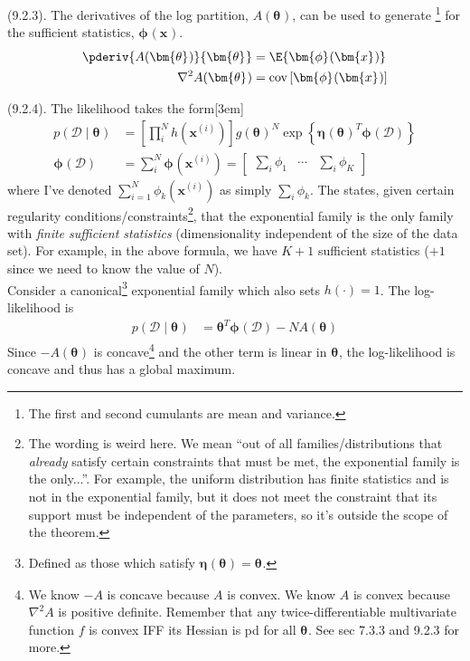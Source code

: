 \documentclass[11pt]{article}
\renewcommand\vec[2][]{\bm{#2}_{#1}}
\newcommand\myspace[1][]{\vspace{#1\bigskipamount}}
\newcommand\p{\Needspace{10\baselineskip} \noindent}
\begin{document}
\myspace
\p {} (9.2.3). The derivatives of the log partition, $A(\vec\theta)$, can be used to generate \footnote{The first and second cumulants are mean and variance.} for the sufficient statistics, $\vec{\phi}(\vec x)$. 
\begin{align}
	\pderiv{A(\vec\theta)}{\vec\theta} &= \E{\vec{\phi}(\vec x)} \\
	\nabla^2 A(\vec\theta) &= \text{cov}\left[ \vec{\phi}(\vec x) \right]
\end{align}


\myspace
\p {} (9.2.4). The likelihood takes the form[3em]
\begin{align}
	p(\mathcal D \mid \vec\theta)
		&= \left[ \prod_i^N h(\vec{x}^{(i)}) \right] g(\vec\theta)^N \exp\left\{ \vec{\eta}(\vec\theta)^T \vec{\phi}(\mathcal D) \right\} \\
	\vec{\phi}(\mathcal D) 
		&=  \sum_i^N \vec{\phi}(\vec{x}^{(i)}) 
		= \begin{bmatrix} \sum_i \phi_1 & \cdots & \sum_i \phi_K  \end{bmatrix}
\end{align}
where I've denoted $\sum_{i=1}^N \phi_k(\vec{x}^{(i)})$ as simply $\sum_i \phi_k$. The  states, given certain regularity conditions/constraints\footnote{The wording is weird here. We mean ``out of all families/distributions that \textit{already} satisfy certain constraints that must be met, the exponential family is the only...''. For example, the uniform distribution has finite statistics and is not in the exponential family, but it does not meet the constraint that its support must be independent of the parameters, so it's outside the scope of the theorem.}, that the exponential family is the only family with \textit{finite sufficient statistics} (dimensionality independent of the size of the data set). For example, in the above formula, we have $K + 1$ sufficient statistics ($+1$ since we need to know the value of $N$). \\

\p Consider a canonical\footnote{Defined as those which satisfy $\vec{\eta}(\vec\theta) = \vec\theta$.} exponential family which also sets $h(\cdot) = 1$. The log-likelihood is
\begin{align}
	p(\mathcal D \mid \vec\theta)
		&= \vec\theta^T \vec{\phi}(\mathcal D) - N A (\vec\theta)
\end{align}
Since $-A(\vec\theta)$ is concave\footnote{We know $-A$ is concave because $A$ is convex. We know $A$ is convex because $\nabla^2 A$ is positive definite. Remember that any twice-differentiable multivariate function $f$ is convex IFF its Hessian is pd for all $\vec\theta$. See sec 7.3.3 and 9.2.3 for more.} and the other term is linear in $\vec\theta$, the log-likelihood is concave and thus has a global maximum.
\end{document}
